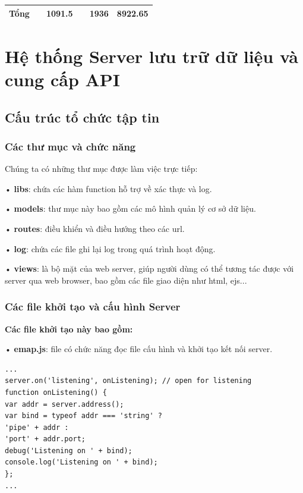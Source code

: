 \begin{table}[H]
\begin{tabular}{|l|l|r|r|r|r|}
		\textbf{Tổng} & \textbf{}                                                             & \textbf{1091.5}                                                                             & \textbf{}                                                                                  & \textbf{1936}                                                                                   & \textbf{8922.65}                                                                       \\ \hline
	\end{tabular}
\end{table}

\section{Hệ thống Server lưu trữ dữ liệu và cung cấp API}

\subsection{Cấu trúc tổ chức tập tin}
\subsubsection*{Các thư mục và chức năng}
Chúng ta có những thư mục được làm việc trực tiếp:

• \textbf{libs}: chứa các hàm function hỗ trợ về xác thực và log.

• \textbf{models}: thư mục này bao gồm các mô hình quản lý cơ sở dữ liệu.

• \textbf{routes}: điều khiển và điều hướng theo các url.

• \textbf{log}: chứa các file ghi lại log trong quá trình hoạt động.

• \textbf{views}: là bộ mặt của web server, giúp người dùng có thể tương tác được với server qua web browser, bao gồm các file giao diện như html, ejs...   


\subsubsection*{Các file khởi tạo và cấu hình Server}

\textbf{Các file khởi tạo này bao gồm:}

• \textbf{emap.js}: file có chức năng đọc file cấu hình và khởi tạo kết nối server.
\begin{lstlisting}[caption=emap.js]
...
server.on('listening', onListening); // open for listening
function onListening() {
var addr = server.address();
var bind = typeof addr === 'string' ?
'pipe' + addr :
'port' + addr.port;
debug('Listening on ' + bind);
console.log('Listening on ' + bind);
};
...
\end{lstlisting}

